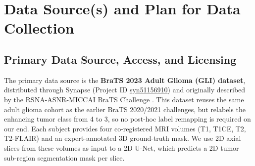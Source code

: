 



\section{Data Source(s) and Plan for Data Collection}
\subsection{Primary Data Source, Access, and Licensing}
The primary data source is the \textbf{BraTS 2023 Adult Glioma (GLI) dataset}, distributed through Synapse (Project ID \href{https://www.synapse.org/\#!Synapse:syn51156910}{syn51156910}) and originally described by the RSNA-ASNR-MICCAI BraTS Challenge \cite{baid2021brats,menze2015brats,bakas2017sdata}. This dataset reuses the same adult glioma cohort as the earlier BraTS 2020/2021 challenges, but relabels the enhancing tumor class from 4 to 3, so no post-hoc label remapping is required on our end. Each subject provides four co-registered MRI volumes (T1, T1CE, T2, T2-FLAIR) and an expert-annotated 3D ground-truth mask. We use 2D axial slices from these volumes as input to a 2D U-Net, which predicts a 2D tumor sub-region segmentation mask per slice.
